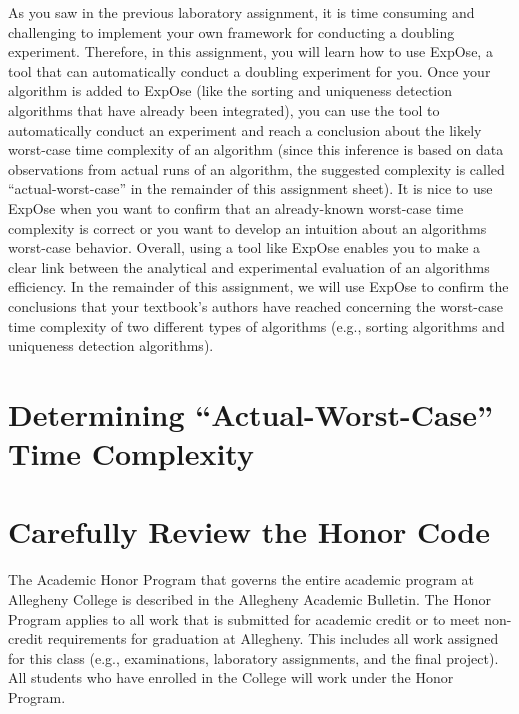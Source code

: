 As you saw in the previous laboratory assignment, it is time consuming and challenging to implement your own framework
for conducting a doubling experiment. Therefore, in this assignment, you will learn how to use {\sc ExpOse}, a tool that
can automatically conduct a doubling experiment for you. Once your algorithm is added to {\sc ExpOse} (like the sorting
and uniqueness detection algorithms that have already been integrated), you can use the tool to automatically conduct an
experiment and reach a conclusion about the likely worst-case time complexity of an algorithm (since this inference is
based on data observations from actual runs of an algorithm, the suggested complexity is called ``actual-worst-case'' in
the remainder of this assignment sheet). It is nice to use {\sc ExpOse} when you want to confirm that an already-known
worst-case time complexity is correct or you want to develop an intuition about an algorithms worst-case behavior.
Overall, using a tool like {\sc ExpOse} enables you to make a clear link between the analytical and experimental
evaluation of an algorithms efficiency. In the remainder of this assignment, we will use {\sc ExpOse} to confirm the
conclusions that your textbook's authors have reached concerning the worst-case time complexity of two different types of
algorithms (e.g., sorting algorithms and uniqueness detection algorithms).

\section*{Determining ``Actual-Worst-Case'' Time Complexity}

\section*{Carefully Review the Honor Code}

The Academic Honor Program that governs the entire academic program at Allegheny College is described in the Allegheny
Academic Bulletin. The Honor Program applies to all work that is submitted for academic credit or to meet non-credit
requirements for graduation at Allegheny. This includes all work assigned for this class (e.g., examinations, laboratory
assignments, and the final project). All students who have enrolled in the College will work under the Honor Program.


